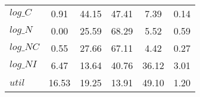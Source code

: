 \begin{center}
\begin{longtable}{lccccc}
$log\_C          $	 & 	        0.91	 & 	       44.15	 & 	       47.41	 & 	        7.39	 & 	        0.14 \\ 
$log\_N          $	 & 	        0.00	 & 	       25.59	 & 	       68.29	 & 	        5.52	 & 	        0.59 \\ 
$log\_NC         $	 & 	        0.55	 & 	       27.66	 & 	       67.11	 & 	        4.42	 & 	        0.27 \\ 
$log\_NI         $	 & 	        6.47	 & 	       13.64	 & 	       40.76	 & 	       36.12	 & 	        3.01 \\ 
${util}          $	 & 	       16.53	 & 	       19.25	 & 	       13.91	 & 	       49.10	 & 	        1.20 \\ 
\end{longtable}
 \end{center}
